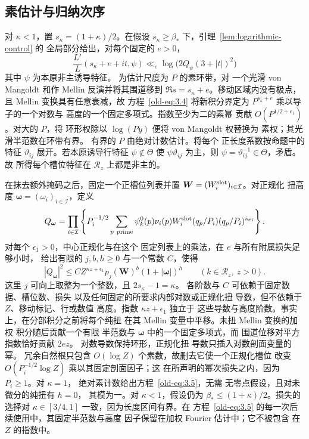 \documentclass[11pt,a4paper]{article}
\numberwithin{equation}{section}
\numberwithin{figure}{section}
\theoremstyle{definition}
\theoremstyle{remark}
\begin{document}
\subsection{素估计与归纳次序}\label{sec:weighted}

对 \(\kappa<1\)，置 \(s_\kappa=(1+\kappa)/2\)。在假设
\(s_\kappa\ge\beta_*\) 下，引理~\ref{lem:logarithmic-control} 的
全局部分给出，对每个固定的 \(e>0\)，
\begin{equation}
 \frac{L'}{L}(s_\kappa+e+it,\psi)
 \ll_e \log\!\bigl(2Q_\psi(3+|t|)^2\bigr)
 \label{old-eq:3.4}
\end{equation}
其中 \(\psi\) 为本原非主诱导特征。
为估计尺度为 \(P\) 的素环带，对
一个光滑 von Mangoldt 和作 Mellin 反演并将其围道移到
\(\Re s=s_\kappa+e\)。移动区域内没有极点，
且 Mellin 变换具有任意衰减，故
方程~\eqref{old-eq:3.4} 将新积分界定为
\(P^{s_\kappa+e}\) 乘以导子的一个对数与
高度的一个固定多项式。指数至少为二的素幂
贡献 \(O(P^{1/2+\epsilon_1})\)。对大的 \(P\)，将
环形权除以 \(\log(Py)\) 便将 von Mangoldt 权替换为
素权；其光滑半范数在环带有界。
有界的 \(P\) 由绝对计数估计。将每个
正长度系数按命题中的特征 \(\vartheta_{ij}\)
展开。若本原诱导行特征
\(\psi\notin\Theta\) 使 \(\psi\vartheta_{ij}\) 为主，则
\(\psi=\vartheta_{ij}^{-1}\in\Theta\)，矛盾。故
所得每个槽位特征在 \(\mathcal R_z\) 上都是非主的。

在抹去额外掩码之后，固定一个正槽位列表并置
\(\boldsymbol W=(W_i^{\rm slot})_{i\in\mathcal I}\)。对正规化
扭高度 \(\boldsymbol\omega=(\omega_i)_{i\in\mathcal I}\)，定义
\[
 Q_{\boldsymbol\omega}
 =\prod_{i\in\mathcal I}\left\{P_i^{-1/2}
   \sum_{p\ {\rm prime}}\psi_k^0(p)\nu_i(p)W_i^{\rm slot}(q_p/P_i)
                       (q_p/P_i)^{i\omega_i}\right\}.
\]
对每个 \(\epsilon_1>0\)，中心正规化与在这个
固定列表上的乘法，在 \(e\) 与所有附属损失足够小时，
给出有限的 \(j,b,h\ge0\) 与一个常数 \(C\)，使得
\begin{equation}
 |Q_{\boldsymbol\omega}|^2
 \le C Z^{\kappa z+\epsilon_1}p_j(\boldsymbol W)^b
                 (1+|\boldsymbol\omega|)^h
 \qquad(k\in\mathcal R_z,\ z>0).
 \label{old-eq:3.5}
\end{equation}
这里 \(j\) 可向上取整为一个整数，且 \(2s_\kappa-1=\kappa\)。
各阶数与 \(C\) 可依赖于固定数据、槽位数、损失
以及任何固定的所要求内部对数或正规化扭
导数，但不依赖于 \(Z\)、移动标记、行或数值
高度。指数 \(\kappa z+\epsilon_1\) 独立于
这些导数与高度阶数。事实上，在分部积分之前将每个纯扭
在其 Mellin 变量中平移。未扭 Mellin 变换的加权
积分随后贡献一个有限
半范数与 \(\boldsymbol\omega\) 中的一个固定多项式，而
围道位移对平方指数恰好贡献 \(2ez\)。
对数导数保持环形，正规化扭
导数只插入对数剖面变量的幂。
冗余自然根只包含
\(O(\log Z)\) 个素数，故删去它使一个正规化槽位
改变 \(O(P_i^{-1/2}\log Z)\) 乘以其固定剖面因子；这
在所声明的幂次损失之内，因为 \(P_i\ge1\)。对 \(\kappa=1\)，
绝对素计数给出方程~\eqref{old-eq:3.5}，无需
无零点假设，且对未微分的纯扭有 \(h=0\)，
其模为一。对 \(\kappa<1\)，假设仍为
\(\beta_*\le(1+\kappa)/2\)。损失的选择对
\(\kappa\in[3/4,1]\) 一致，因为长度区间有界。在
方程~\eqref{old-eq:3.5} 的每一次后续使用中，其固定半范数与高度
因子保留在加权 Fourier 估计中；它不被包含
在 \(Z\) 的指数中。
\end{document}
